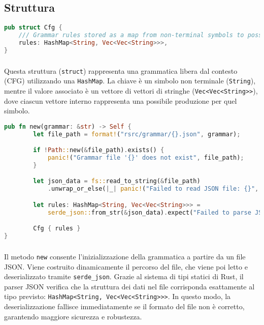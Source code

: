 \subsection{Struttura}

\begin{lstlisting}[language=rust, caption = Struttura rappresentante una grammatica CFG]    
pub struct Cfg {
    /// Grammar rules stored as a map from non-terminal symbols to possible RHS sequences.
    rules: HashMap<String, Vec<Vec<String>>>,
}
\end{lstlisting}
\subsubsection{}
Questa struttura (\texttt{struct}) rappresenta una grammatica libera dal contesto (CFG) utilizzando una \texttt{HashMap}. La chiave è un simbolo non terminale (\texttt{String}), mentre il valore associato è un vettore di vettori di stringhe (\texttt{Vec<Vec<String>>}), dove ciascun vettore interno rappresenta una possibile produzione per quel simbolo.

\begin{lstlisting}[language=rust, caption = Inizializzazione di una grammatica]    
pub fn new(grammar: &str) -> Self {
        let file_path = format!("rsrc/grammar/{}.json", grammar);

        if !Path::new(&file_path).exists() {
            panic!("Grammar file '{}' does not exist", file_path);
        }

        let json_data = fs::read_to_string(&file_path)
            .unwrap_or_else(|_| panic!("Failed to read JSON file: {}", file_path));

        let rules: HashMap<String, Vec<Vec<String>>> =
            serde_json::from_str(&json_data).expect("Failed to parse JSON");

        Cfg { rules }
}
\end{lstlisting}
\subsubsection{}

Il metodo \texttt{new} consente l'inizializzazione della grammatica a partire da un file JSON. Viene costruito dinamicamente il percorso del file, che viene poi letto e deserializzato tramite \texttt{serde\_json}.
Grazie al sistema di tipi statici di Rust, il parser JSON verifica che la struttura dei dati nel file corrisponda esattamente al tipo previsto: \texttt{HashMap<String, Vec<Vec<String>>>}. In questo modo, la deserializzazione fallisce immediatamente se il formato del file non è corretto, garantendo maggiore sicurezza e robustezza.


